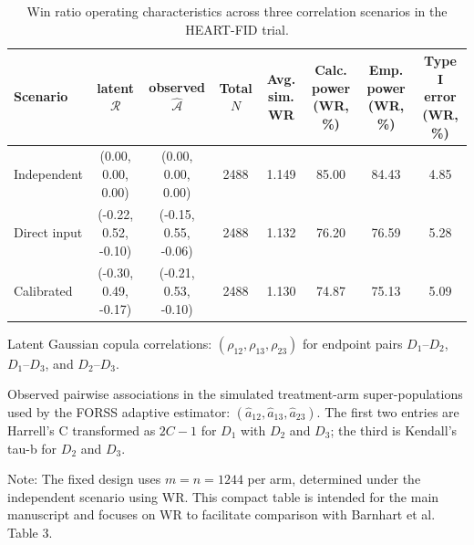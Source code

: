 \begin{table}[ht!]
\centering
\caption{Win ratio operating characteristics across three correlation scenarios in the HEART-FID trial.}
\label{tab:heartfid_power_main}
\begin{threeparttable}
\setlength{\tabcolsep}{4.2pt}
\renewcommand{\arraystretch}{1.08}
\begin{tabular}{@{}l c c c c c c c@{}}
\toprule
\textbf{Scenario} & latent $\bm{\mathcal{R}}$\tnote{a} & observed $\widehat{\bm{\mathcal{A}}}$\tnote{b} & Total $N$ & Avg. sim. WR & Calc. power (WR, \%) & Emp. power (WR, \%) & Type I error (WR, \%) \\
\midrule
Independent & (0.00, 0.00, 0.00) & (0.00, 0.00, 0.00) & 2488 & 1.149 & 85.00 & 84.43 & 4.85 \\
Direct input & (-0.22, 0.52, -0.10) & (-0.15, 0.55, -0.06) & 2488 & 1.132 & 76.20 & 76.59 & 5.28 \\
Calibrated & (-0.30, 0.49, -0.17) & (-0.21, 0.53, -0.10) & 2488 & 1.130 & 74.87 & 75.13 & 5.09 \\
\bottomrule
\end{tabular}
\begin{tablenotes}\footnotesize
\item[a] Latent Gaussian copula correlations: $(\rho_{12}, \rho_{13}, \rho_{23})$ for endpoint pairs $D_1$--$D_2$, $D_1$--$D_3$, and $D_2$--$D_3$.
\item[b] Observed pairwise associations in the simulated treatment-arm super-populations used by the FORSS adaptive estimator: $(\hat{a}_{12}, \hat{a}_{13}, \hat{a}_{23})$. The first two entries are Harrell's C transformed as $2C-1$ for $D_1$ with $D_2$ and $D_3$; the third is Kendall's tau-b for $D_2$ and $D_3$.
\item Note: The fixed design uses $m=n=1244$ per arm, determined under the independent scenario using WR. This compact table is intended for the main manuscript and focuses on WR to facilitate comparison with Barnhart et al. Table 3.
\end{tablenotes}
\end{threeparttable}
\end{table}
